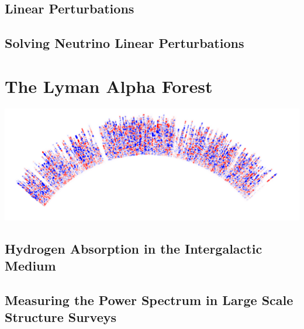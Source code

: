 \documentclass[11pt, twoside, a4paper, openright]{report}
\begin{document}
	\section{Linear Perturbations}
	\label{sec:LP}
	
	
	\section{Solving Neutrino Linear Perturbations}
	\label{sec:CAMB}
	


\setcounter{chapter}{3}
\chapter{The Lyman Alpha Forest}
{\color{purple}\titlerule[2.5pt]}
\vspace{4pc}%
\label{chap:LyaForest}
{\centering
\includegraphics[width=\textwidth]{LyaFeBOSS_bckgdwhite.png}}
\clearpage

	

	\section{Hydrogen Absorption in the Intergalactic Medium}
	\label{sec:p1d}
	

	\section{Measuring the Power Spectrum in Large Scale Structure Surveys}
	\label{sec:pfdata}
	


\setcounter{chapter}{4}
\end{document}
